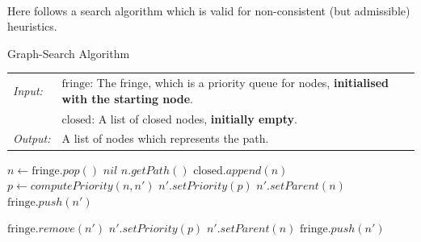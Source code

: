 \documentclass[9pt,a4paper]{extarticle}
\newenvironment{solution}
    {%
    \color{red}
    }
    { 
    \color{black}
    }
\begin{document}
    \begin{solution}
    \\
    Here follows a search algorithm which is valid for non-consistent (but admissible) heuristics.
\begin{algorithm}[H]
\caption{Graph-Search Algorithm}\label{algo:GS}
\begin{tabular}{ll}
    \textit{Input:}  & $\text{fringe}$: The fringe, which is a priority queue for nodes, \textbf{initialised with the starting node}. \\
     & $\text{closed}$: A list of closed nodes, \textbf{initially empty}.\\
     \textit{Output:}  &  A list of nodes which represents the path.\\
\end{tabular}
\small
\begin{algorithmic}[1]
\State $n \gets \text{fringe}.pop()$ %
 \State \Return $nil$
\EndIf
{}
   \State \Return $n.getPath()$
\EndIf
\State $\text{closed}.append(n)$
    \State $p \gets computePriority(n, n')$
    \State $n'.setPriority(p)$
    \State $n'.setParent(n)$
    \State $\text{fringe}.push(n')$
    
    \State $\text{fringe}.remove(n')$
    \State $n'.setPriority(p)$
    \State $n'.setParent(n)$
    \State $\text{fringe}.push(n')$
    
    \EndIf
\EndFor
\EndWhile
\EndProcedure
\end{algorithmic}
\vspace{1em}
\end{algorithm}
    \end{solution}
\end{document}
